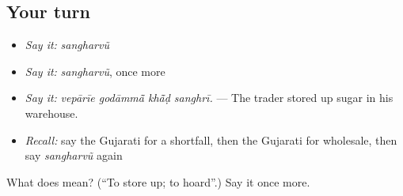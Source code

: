 \subsection*{Your turn}
\begin{itemize}
\raggedright
  \item \emph{Say it:} \emph{sangharvũ}
  \item \emph{Say it:} \emph{sangharvũ}, once more
  \item \emph{Say it:} \emph{vepārīe godāmmā̃ khā̃ḍ sanghrī.} — The trader stored up sugar in his warehouse.
  \item \emph{Recall:} say the Gujarati for a shortfall, then the Gujarati for wholesale, then say \emph{sangharvũ} again
\end{itemize}

\begin{tcolorbox}[breakable,colback=teal!4,colframe=teal!35!black,title={Before you move on}]
What does  mean? (\textquotedblleft{}To store up; to hoard\textquotedblright{}.) Say it once more.
\end{tcolorbox}

